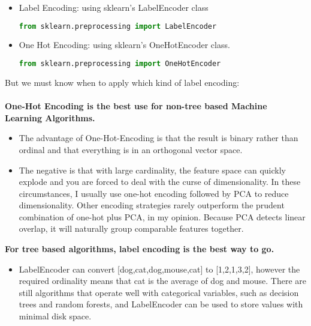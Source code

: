 \begin{itemize}
	\item{Label Encoding: using sklearn's LabelEncoder class}
	\begin{lstlisting}[language=Python, caption=Label Encoder, numbers=none]
	from sklearn.preprocessing import LabelEncoder\end{lstlisting}
	\item{One Hot Encoding: using sklearn's OneHotEncoder class.}
	\begin{lstlisting}[language=Python, caption=Get dummies, numbers=none]
	from sklearn.preprocessing import OneHotEncoder\end{lstlisting}
\end{itemize}
But we must know when to apply which kind of label encoding: \\
\\
\noindent
\textbf{One-Hot Encoding is the best use for non-tree based Machine Learning Algorithms.}
\begin{itemize}
	\item The advantage of One-Hot-Encoding is that the result is binary rather than ordinal and that everything is in an orthogonal vector space.
	\item The negative is that with large cardinality, the feature space can quickly explode and you are forced to deal with the curse of dimensionality. In these circumstances, I usually use one-hot encoding followed by PCA to reduce dimensionality. Other encoding strategies rarely outperform the prudent combination of one-hot plus PCA, in my opinion. Because PCA detects linear overlap, it will naturally group comparable features together.
\end{itemize}

\noindent
\textbf{For tree based algorithms, label encoding is the best way to go.}

\begin{itemize}
	\item{LabelEncoder can convert [dog,cat,dog,mouse,cat] to [1,2,1,3,2], however the required ordinality means that cat is the average of dog and mouse. There are still algorithms that operate well with categorical variables, such as decision trees and random forests, and LabelEncoder can be used to store values with minimal disk space.}
\end{itemize}

